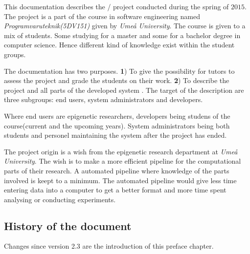 \thispagestyle{preface}

%
%

This documentation describes the \appName/ project conducted during the spring of $2015$. The project is a part of the course in software engineering named \textit{Programvaruteknik(5DV151)} given by \textit{Umeå University}. The course is given to a mix of students. Some studying for a master and some for a bachelor degree in computer science. Hence different kind of knowledge exist within the student groups.

The documentation has two purposes. \textbf{1}) To give the possibility for tutors to assess the project and grade the students on their work. \textbf{2}) To describe the project and all parts of the developed system . 
The target of the description are three subgroups: end users, system administrators and developers.

Where end users are epigenetic researchers, developers being studens of the course(current and the upcoming years). System administrators being both students and personel maintaining the system after the project has ended.

The project origin is a wish from the epigenetic research department at \textit{Umeå University}. The wish is to make a more efficient pipeline for the computational parts of their research. A automated pipeline where knowledge of the parts involved is keept to a minimum. The automated pipeline would give less time entering data into a computer to get a better format and more time spent analysing or conducting experiments. 

\subsection*{History of the document}\vspace*{-10pt}
Changes since version 2.3 are the introduction of this preface chapter.

